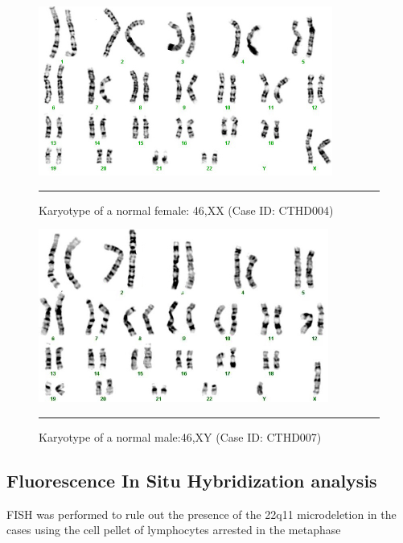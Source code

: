 \begin{refsection}
\begin{figure}[!tb]
\centering
\includegraphics[width=\linewidth]{Figures/2_2nmlfemale.pdf} 
\rule{35em}{0.5pt}
\caption{Karyotype of a normal female: 46,XX (Case ID: CTHD004)}
\label{fig:2_2nmlfemale}
\end{figure}

\begin{figure}[!tb]
\centering
\includegraphics[width=\linewidth]{Figures/2_3nmlmale.pdf} 
\rule{35em}{0.5pt}
\caption{Karyotype of a normal male:46,XY (Case ID: CTHD007)}
\label{fig:2_3nmlmale}
\end{figure}

\subsection{Fluorescence In Situ Hybridization analysis}
FISH was performed to rule out the presence of the 22q11 microdeletion in the cases using the cell pellet of lymphocytes arrested in the metaphase

\end{refsection}
